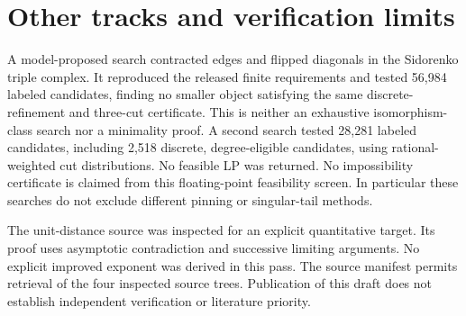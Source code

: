 \documentclass[11pt]{article}
\begin{document}
\section{Other tracks and verification limits}
A model-proposed search contracted edges and flipped diagonals in the
Sidorenko triple complex. It reproduced the released finite requirements
and tested 56,984 labeled candidates, finding no smaller object satisfying
the same discrete-refinement and three-cut certificate. This is neither
an exhaustive isomorphism-class search nor a minimality proof. A second
search tested 28,281 labeled candidates, including 2,518 discrete,
degree-eligible candidates, using rational-weighted cut distributions.
No feasible LP was returned. No impossibility certificate is claimed
from this floating-point feasibility screen. In particular these searches
do not exclude different pinning or singular-tail methods.

The unit-distance source was inspected for an explicit quantitative
target. Its proof uses asymptotic contradiction and successive limiting
arguments. No explicit improved exponent was derived in this pass.
The source manifest permits retrieval of the four inspected source trees.
Publication of this draft does not establish independent verification or
literature priority.
\end{document}
